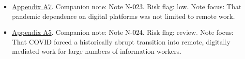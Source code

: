 \documentclass[
  american,
  11pt,
  letterpaper,
]{article}
\begin{document}
\begin{itemize}
  stress.
\item
  \hyperref[appendix-a7-what-social-media-told-about-us-in-the-time-of-covid-19-a-scoping-review]{Appendix
  A7}. Companion note: Note N-023. Risk flag: low. Note focus: That
  pandemic dependence on digital platforms was not limited to remote
  work.
\item
  \hyperref[appendix-a5-how-work-from-home-affects-collaboration-a-large-scale-study-of-information-workers-in-a-natural-experiment-during-covid-19]{Appendix
  A5}. Companion note: Note N-024. Risk flag: review. Note focus: That
  COVID forced a historically abrupt transition into remote, digitally
  mediated work for large numbers of information workers.
\end{itemize}
\end{document}
